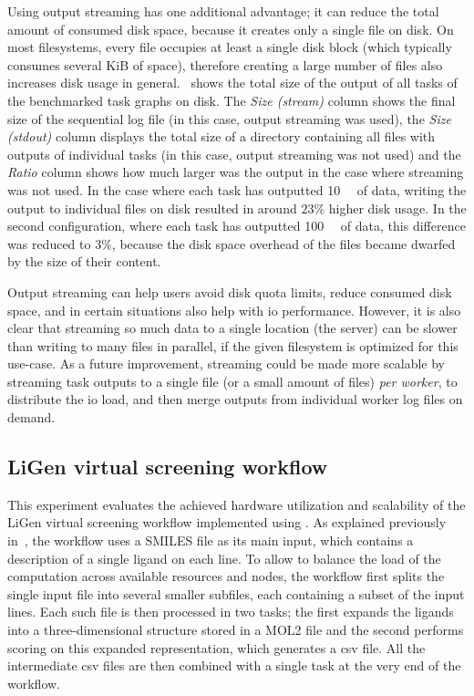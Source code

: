 Using output streaming has one additional advantage; it can reduce the total amount of consumed
disk space, because it creates only a single file on disk. On most filesystems, every file occupies
at least a single disk block (which typically consumes several KiB of space), therefore creating a
large number of files also increases disk usage in general.~ shows the total
size of the output of all tasks of the benchmarked task graphs on disk. The \emph{Size (stream)}
column shows the final size of the sequential log file (in this case, output streaming was used),
the \emph{Size (stdout)} column displays the total size of a directory containing all files with
outputs of individual tasks (in this case, output streaming was not used) and the
\emph{Ratio} column shows how much larger was the output in the case where streaming was
not used. In the case where each task has outputted \SI{10}{\kibi\byte} of data, writing the
output to individual files on disk resulted in around $23\%$ higher disk usage. In
the second configuration, where each task has outputted \SI{100}{\kibi\byte} of data, this
difference was reduced to $3\%$, because the disk space overhead of the files
became dwarfed by the size of their content.

Output streaming can help users avoid disk quota limits, reduce consumed disk space, and in certain
situations also help with \gls{io} performance. However, it is also clear that
streaming so much data to a single location (the server) can be slower than writing to many files
in parallel, if the given filesystem is optimized for this use-case. As a future improvement,
streaming could be made more scalable by streaming task outputs to a single file (or a small amount
of files) \emph{per worker}, to distribute the \gls{io} load, and then merge
outputs from individual worker log files on demand.

\subsection{LiGen virtual screening workflow}
\label{sec:hq-exp-ligen}
This experiment evaluates the achieved hardware utilization and scalability of the LiGen virtual
screening workflow implemented using \hyperqueue{}. As explained previously
in~, the workflow uses a SMILES file as its main input, which contains a
description of a single ligand on each line. To allow \hyperqueue{} to balance the load
of the computation across available resources and nodes, the workflow first splits the single input
file into several smaller subfiles, each containing a subset of the input lines. Each such file is
then processed in two tasks; the first expands the ligands into a three-dimensional structure
stored in a MOL2 file and the second performs scoring on this expanded representation, which
generates a \gls{csv} file. All the intermediate \gls{csv} files are
then combined with a single task at the very end of the workflow.

